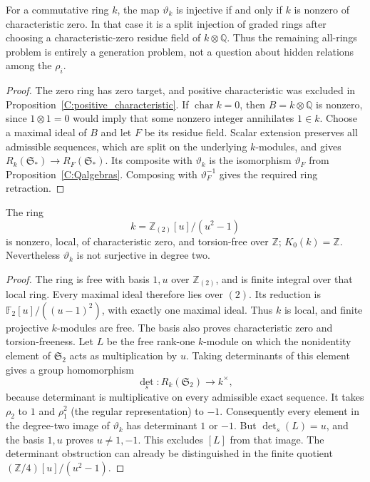\begin{corollary}
\label{C:allrings_injectivity}
For a commutative ring $k$, the map $\vartheta_k$ is injective if and only
if $k$ is nonzero of characteristic zero. In that case it is a split
injection of graded rings after choosing a characteristic-zero residue
field of $k\otimes\mathbb Q$. Thus the remaining all-rings problem is
entirely a generation problem, not a question about hidden relations
among the $\rho_i$.
\end{corollary}
\begin{proof}
The zero ring has zero target, and positive characteristic was excluded
in Proposition~\ref{C:positive_characteristic}. If $\operatorname{char}k=0$,
then $B=k\otimes\mathbb Q$ is nonzero, since $1\otimes1=0$ would imply
that some nonzero integer annihilates $1\in k$. Choose a maximal ideal
of $B$ and let $F$ be its residue field. Scalar extension preserves all
admissible sequences, which are split on the underlying $k$-modules,
and gives $R_k(\mathfrak S_*)\to R_F(\mathfrak S_*)$. Its composite
with $\vartheta_k$ is the isomorphism $\vartheta_F$ from
Proposition~\ref{C:Qalgebras}. Composing with $\vartheta_F^{-1}$ gives
the required ring retraction.
\end{proof}

\begin{proposition}
\label{C:local_charzero_counterexample}
The ring
\[
 k=\mathbb Z_{(2)}[u]/(u^2-1)
\]
is nonzero, local, of characteristic zero, and torsion-free over $\mathbb Z$;
$K_0(k)=\mathbb Z$. Nevertheless $\vartheta_k$ is not surjective in degree two.
\end{proposition}
\begin{proof}
The ring is free with basis $1,u$ over $\mathbb Z_{(2)}$, and is finite integral
over that local ring. Every maximal ideal therefore lies over $(2)$.
Its reduction is $\mathbb F_2[u]/((u-1)^2)$, with exactly one maximal ideal.
Thus $k$ is local, and finite projective $k$-modules are free. The basis also
proves characteristic zero and torsion-freeness.
Let $L$ be the free rank-one $k$-module on which the nonidentity element of
$\mathfrak S_2$ acts as multiplication by $u$.
Taking determinants of this element gives a group homomorphism
\[
 \det_s:R_k(\mathfrak S_2)\longrightarrow k^\times,
\]
because determinant is multiplicative on every admissible exact sequence.
It takes $\rho_2$ to $1$ and $\rho_1^2$ (the regular representation) to $-1$.
Consequently every element in the degree-two image of $\vartheta_k$ has
determinant $1$ or $-1$. But $\det_s(L)=u$, and the basis $1,u$ proves
$u\ne1,-1$. This excludes $[L]$ from that image. The determinant obstruction
can already be distinguished in the finite quotient
$(\mathbb Z/4)[u]/(u^2-1)$.
\end{proof}

